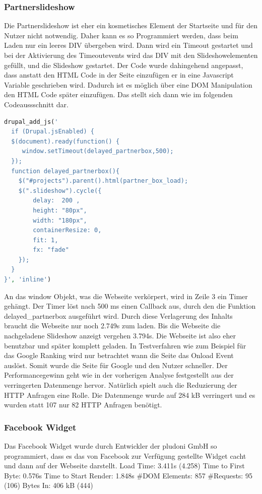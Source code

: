 \subsubsection{Partnerslideshow} Die Partnerslideshow ist eher ein kosmetisches Element der Startseite und für den Nutzer nicht notwendig. Daher kann es so Programmiert werden, dass beim Laden nur ein leeres DIV übergeben wird. Dann wird ein Timeout gestartet und bei der Aktivierung des Timeoutevents wird das DIV mit den Slideshowelementen gefüllt, und die Slideshow gestartet. Der Code wurde dahingehend angepasst, dass anstatt den HTML Code in der Seite einzufügen er in eine Javascript Variable geschrieben wird. Dadurch ist es möglich über eine DOM Manipulation den HTML Code später einzufügen. Das stellt sich dann wie im folgenden Codeaussschnitt dar.
\begin{lstlisting}[language=php,label=Javascript wird eingefügt für die Slideshow,caption=Javascript wird eingefügt für die Slideshow]
drupal_add_js('
  if (Drupal.jsEnabled) {
  $(document).ready(function() {
     window.setTimeout(delayed_partnerbox,500);
  });
  function delayed_partnerbox(){
	$("#projects").parent().html(partner_box_load);
	$(".slideshow").cycle({
	    delay:  200 ,
	    height: "80px",
	    width: "180px",
	    containerResize: 0,
	    fit: 1,
	    fx: "fade"
	});
  }
}', 'inline')
\end{lstlisting}
An das window Objekt, was die Webseite verkörpert, wird in Zeile 3 ein Timer gehängt. Der Timer löst nach 500 ms einen Callback aus, durch den die Funktion delayed_partnerbox ausgeführt wird. Durch diese Verlagerung des Inhalts braucht die Webseite nur noch 2.749s zum laden. Bis die Webseite die nachgeladene Slideshow anzeigt vergehen 3.794s. Die Webseite ist also eher benutzbar und später komplett geladen. In Testverfahren wie zum Beispiel für das Google Ranking wird nur betrachtet wann die Seite das Onload Event auslöst. Somit wurde die Seite für Google und den Nutzer schneller. Der Performancegewinn geht wie in der vorherigen Analyse festgestellt aus der verringerten Datenmenge hervor. Natürlich spielt auch die Reduzierung der HTTP Anfragen eine Rolle. Die Datenmenge wurde auf 284 kB verringert und es wurden statt 107 nur 82 HTTP Anfragen benötigt.

\subsubsection{Facebook Widget} Das Facebook Widget wurde durch Entwickler der pludoni GmbH so programmiert, dass es das von Facebook zur Verfügung gestellte Widget cacht und dann auf der Webseite darstellt. 
Load Time: 3.411s (4.258)
Time to First Byte: 0.576s %
Time to Start Render: 1.848s
\#DOM Elements: 857
\#Requests: 95 (106)
Bytes In: 406 kB (444)

